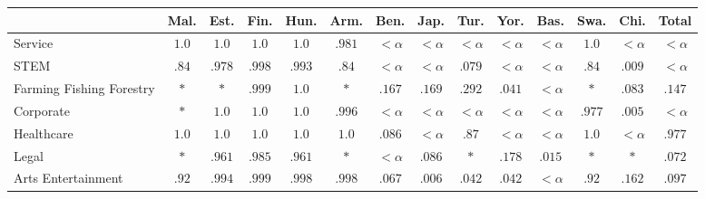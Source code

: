 \documentclass[fleqn,10pt]{article}
\begin{document}
\begin{table}[H]
\small
\begin{tabular}{|m{1.75cm}|cccccccccccc|c|}
\hline
& Mal. & Est. & Fin. & Hun. & Arm. & Ben. & Jap. & Tur. & Yor. & Bas. & Swa. & Chi. & Total \\ \hline
Service & \cellcolor{blue!25}$1.0$ & \cellcolor{blue!25}$1.0$ & \cellcolor{blue!25}$1.0$ & \cellcolor{blue!25}$1.0$ & \cellcolor{blue!25}$.981$ & $<\alpha$ & $<\alpha$ & $<\alpha$ & $<\alpha$ & $<\alpha$ & \cellcolor{blue!25}$1.0$ & $<\alpha$ & $<\alpha$  \\ \cline{1-1} 
STEM & \cellcolor{blue!25}$.84$ & \cellcolor{blue!25}$.978$ & \cellcolor{blue!25}$.998$ & \cellcolor{blue!25}$.993$ & \cellcolor{blue!25}$.84$ & $<\alpha$ & $<\alpha$ & \cellcolor{blue!25}$.079$ & $<\alpha$ & $<\alpha$ & \cellcolor{blue!25}$.84$ & \cellcolor{blue!25}$.009$ & $<\alpha$  \\ \cline{1-1} 
Farming 
 Fishing 
 Forestry & $*$ & $*$ & \cellcolor{blue!25}$.999$ & \cellcolor{blue!25}$1.0$ & $*$ & \cellcolor{blue!25}$.167$ & \cellcolor{blue!25}$.169$ & \cellcolor{blue!25}$.292$ & \cellcolor{blue!25}$.041$ & $<\alpha$ & $*$ & \cellcolor{blue!25}$.083$ & \cellcolor{blue!25}$.147$  \\ \cline{1-1} 
Corporate & $*$ & \cellcolor{blue!25}$1.0$ & \cellcolor{blue!25}$1.0$ & \cellcolor{blue!25}$1.0$ & \cellcolor{blue!25}$.996$ & $<\alpha$ & $<\alpha$ & $<\alpha$ & $<\alpha$ & $<\alpha$ & \cellcolor{blue!25}$.977$ & \cellcolor{blue!25}$.005$ & $<\alpha$  \\ \cline{1-1} 
Healthcare & \cellcolor{blue!25}$1.0$ & \cellcolor{blue!25}$1.0$ & \cellcolor{blue!25}$1.0$ & \cellcolor{blue!25}$1.0$ & \cellcolor{blue!25}$1.0$ & \cellcolor{blue!25}$.086$ & $<\alpha$ & \cellcolor{blue!25}$.87$ & $<\alpha$ & $<\alpha$ & \cellcolor{blue!25}$1.0$ & $<\alpha$ & \cellcolor{blue!25}$.977$  \\ \cline{1-1} 
Legal & $*$ & \cellcolor{blue!25}$.961$ & \cellcolor{blue!25}$.985$ & \cellcolor{blue!25}$.961$ & $*$ & $<\alpha$ & \cellcolor{blue!25}$.086$ & $*$ & \cellcolor{blue!25}$.178$ & \cellcolor{blue!25}$.015$ & $*$ & $*$ & \cellcolor{blue!25}$.072$  \\ \cline{1-1} 
Arts 
 Entertainment & \cellcolor{blue!25}$.92$ & \cellcolor{blue!25}$.994$ & \cellcolor{blue!25}$.999$ & \cellcolor{blue!25}$.998$ & \cellcolor{blue!25}$.998$ & \cellcolor{blue!25}$.067$ & \cellcolor{blue!25}$.006$ & \cellcolor{blue!25}$.042$ & \cellcolor{blue!25}$.042$ & $<\alpha$ & \cellcolor{blue!25}$.92$ & \cellcolor{blue!25}$.162$ & \cellcolor{blue!25}$.097$  \\ \cline{1-1} 

\end{tabular}
\end{table}
\end{document}

